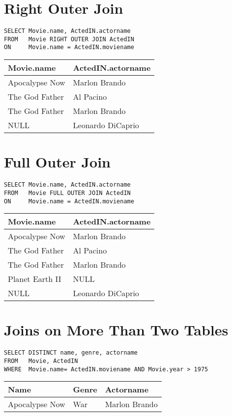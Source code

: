 \documentclass{article}
\begin{document}
\section*{Right Outer Join}
\begin{verbatim}
SELECT Movie.name, ActedIN.actorname
FROM   Movie RIGHT OUTER JOIN ActedIN
ON     Movie.name = ActedIN.moviename
\end{verbatim}

\begin{tabular}{ll}
\hline
Movie.name & ActedIN.actorname \\
\hline
Apocalypse Now & Marlon Brando \\
The God Father & Al Pacino \\
The God Father & Marlon Brando \\
NULL & Leonardo DiCaprio \\
\hline
\end{tabular}

\section*{Full Outer Join}
\begin{verbatim}
SELECT Movie.name, ActedIN.actorname
FROM   Movie FULL OUTER JOIN ActedIN
ON     Movie.name = ActedIN.moviename
\end{verbatim}

\begin{tabular}{ll}
\hline
Movie.name & ActedIN.actorname \\
\hline
Apocalypse Now & Marlon Brando \\
The God Father & Al Pacino \\
The God Father & Marlon Brando \\
Planet Earth II & NULL \\
NULL & Leonardo DiCaprio \\
\hline
\end{tabular}

\section*{Joins on More Than Two Tables}
\begin{verbatim}
SELECT DISTINCT name, genre, actorname
FROM   Movie, ActedIN
WHERE  Movie.name= ActedIN.moviename AND Movie.year > 1975
\end{verbatim}

\begin{tabular}{lll}
\hline
Name & Genre & Actorname \\
\hline
Apocalypse Now & War & Marlon Brando \\
\hline
\end{tabular}
\end{document}
